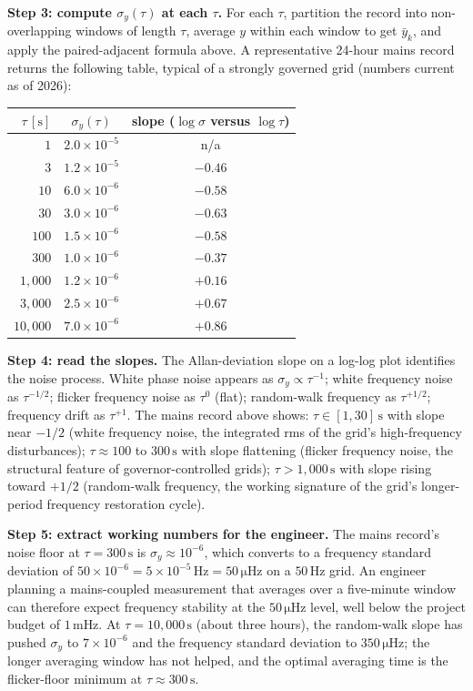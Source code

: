 \textbf{Step 3: compute $\sigma_{y}(\tau)$ at each $\tau$.} For
each $\tau$, partition the record into non-overlapping windows of
length $\tau$, average $y$ within each window to get $\bar y_{k}$,
and apply the paired-adjacent formula above. A representative
24-hour mains record returns the following table, typical of a
strongly governed grid (numbers current as of 2026):

\begin{center}
\begin{tabular}{rcc}
\toprule
$\tau \,[\si{\second}]$ & $\sigma_{y}(\tau)$ & slope ($\log \sigma$
versus $\log \tau$) \\
\midrule
$1$ & $2.0 \times 10^{-5}$ & n/a \\
$3$ & $1.2 \times 10^{-5}$ & $-0.46$ \\
$10$ & $6.0 \times 10^{-6}$ & $-0.58$ \\
$30$ & $3.0 \times 10^{-6}$ & $-0.63$ \\
$100$ & $1.5 \times 10^{-6}$ & $-0.58$ \\
$300$ & $1.0 \times 10^{-6}$ & $-0.37$ \\
$1{,}000$ & $1.2 \times 10^{-6}$ & $+0.16$ \\
$3{,}000$ & $2.5 \times 10^{-6}$ & $+0.67$ \\
$10{,}000$ & $7.0 \times 10^{-6}$ & $+0.86$ \\
\bottomrule
\end{tabular}
\end{center}

\textbf{Step 4: read the slopes.} The Allan-deviation slope on a
log-log plot identifies the noise process. White phase noise
appears as $\sigma_{y} \propto \tau^{-1}$; white frequency noise
as $\tau^{-1/2}$; flicker frequency noise as $\tau^{0}$ (flat);
random-walk frequency as $\tau^{+1/2}$; frequency drift as
$\tau^{+1}$. The mains record above shows:
$\tau \in [1, 30] \,\si{\second}$ with slope near $-1/2$ (white
frequency noise, the integrated rms of the grid's high-frequency
disturbances); $\tau \approx 100$ to $300 \,\si{\second}$ with
slope flattening (flicker frequency noise, the structural feature
of governor-controlled grids); $\tau > 1{,}000 \,\si{\second}$
with slope rising toward $+1/2$ (random-walk frequency, the
working signature of the grid's longer-period frequency
restoration cycle).

\textbf{Step 5: extract working numbers for the engineer.} The
mains record's noise floor at $\tau = 300 \,\si{\second}$ is
$\sigma_{y} \approx 10^{-6}$, which converts to a frequency
standard deviation of $50 \times 10^{-6} = 5 \times 10^{-5} \,\si
{\hertz} = 50 \,\si{\micro\hertz}$ on a $50 \,\si{\hertz}$ grid.
An engineer planning a mains-coupled measurement that averages
over a five-minute window can therefore expect frequency stability
at the $50 \,\si{\micro\hertz}$ level, well below the project
budget of $1 \,\si{\milli\hertz}$. At $\tau = 10{,}000 \,\si
{\second}$ (about three hours), the random-walk slope has pushed
$\sigma_{y}$ to $7 \times 10^{-6}$ and the frequency standard
deviation to $350 \,\si{\micro\hertz}$; the longer averaging
window has not helped, and the optimal averaging time is the
flicker-floor minimum at $\tau \approx 300 \,\si{\second}$.

